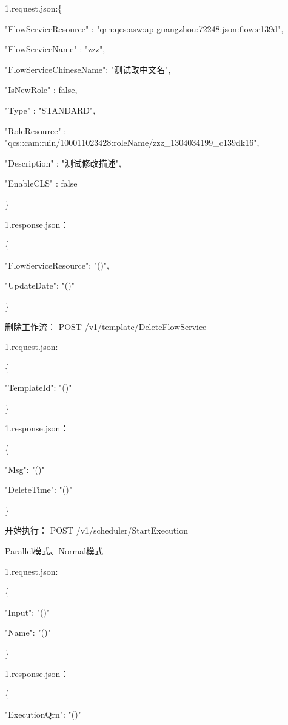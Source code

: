 1.request.json:\{

    "FlowServiceResource"   : "qrn:qcs:asw:ap-guangzhou:72248:json:flow:c139d",


    "FlowServiceName"       :  "zzz",

    "FlowServiceChineseName":  "测试改中文名",

    "IsNewRole"             :  false,

    "Type"                  :  "STANDARD",

    "RoleResource"          :  "qcs::cam::uin/100011023428:roleName/zzz\_1304034199\_c139dk16",

    "Description"           :  "测试修改描述",

    "EnableCLS"             :  false

\}

1.response.json：

\{

"FlowServiceResource": "\@notEmpty()",

"UpdateDate": "\@notEmpty()"

\}

删除工作流：
POST /v1/template/DeleteFlowService

1.request.json:

\{

    "TemplateId": "\@exists()"

\}


1.response.json：

\{

    "Msg": "\@exists()"

    "DeleteTime": "\@exists()"

\}


开始执行：
POST /v1/scheduler/StartExecution

Parallel模式、Normal模式

1.request.json:

\{

"Input": "\@exists()"

"Name": "\@notEmpty()"

\}


1.response.json：

\{

"ExecutionQrn": "\@notEmpty()"

